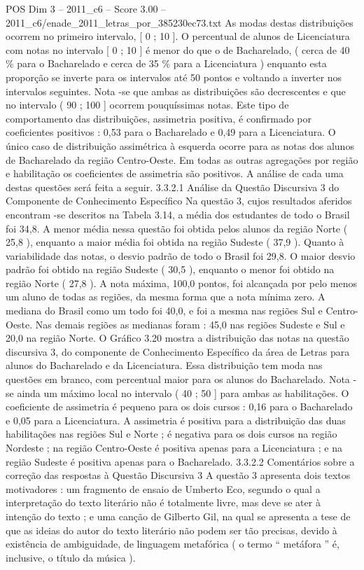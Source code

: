 \begin{textsample}{POS Dim 3 – 2011\_c6 – Score 3.00 – 2011\_c6/enade\_2011\_letras\_por\_385230ec73.txt}
As modas destas distribuições ocorrem no primeiro intervalo, [ 0 ; 10 ].
O percentual de alunos de Licenciatura com notas no intervalo [ 0 ; 10 ] é menor do que o de Bacharelado, ( cerca de 40 \% para o Bacharelado e cerca de 35 \% para a Licenciatura ) enquanto esta proporção se inverte para os intervalos até 50 pontos e voltando a inverter nos intervalos seguintes.
Nota -se que ambas as distribuições são decrescentes e que no intervalo ( 90 ; 100 ] ocorrem pouquíssimas notas.
Este tipo de comportamento das distribuições, assimetria positiva, é confirmado por coeficientes positivos : 0,53 para o Bacharelado e 0,49 para a Licenciatura.
O único caso de distribuição assimétrica à esquerda ocorre para as notas dos alunos de Bacharelado da região Centro-Oeste.
Em todas as outras agregações por região e habilitação os coeficientes de assimetria são positivos.
A análise de cada uma destas questões será feita a seguir. 3.3.2.1 Análise da Questão Discursiva 3 do Componente de Conhecimento Específico Na questão 3, cujos resultados aferidos encontram -se descritos na Tabela 3.14, a média dos estudantes de todo o Brasil foi 34,8.
A menor média nessa questão foi obtida pelos alunos da região Norte ( 25,8 ), enquanto a maior média foi obtida na região Sudeste ( 37,9 ).
Quanto à variabilidade das notas, o desvio padrão de todo o Brasil foi 29,8.
O maior desvio padrão foi obtido na região Sudeste ( 30,5 ), enquanto o menor foi obtido na região Norte ( 27,8 ).
A nota máxima, 100,0 pontos, foi alcançada por pelo menos um aluno de todas as regiões, da mesma forma que a nota mínima zero.
A mediana do Brasil como um todo foi 40,0, e foi a mesma nas regiões Sul e Centro-Oeste.
Nas demais regiões as medianas foram : 45,0 nas regiões Sudeste e Sul e 20,0 na região Norte.
O Gráfico 3.20 mostra a distribuição das notas na questão discursiva 3, do componente de Conhecimento Específico da área de Letras para alunos do Bacharelado e da Licenciatura.
Essa distribuição tem moda nas questões em branco, com percentual maior para os alunos do Bacharelado.
Nota -se ainda um máximo local no intervalo ( 40 ; 50 ] para ambas as habilitações.
O coeficiente de assimetria é pequeno para os dois cursos : 0,16 para o Bacharelado e 0,05 para a Licenciatura.
A assimetria é positiva para a distribuição das duas habilitações nas regiões Sul e Norte ; é negativa para os dois cursos na região Nordeste ; na região Centro-Oeste é positiva apenas para a Licenciatura ; e na região Sudeste é positiva apenas para o Bacharelado. 3.3.2.2 Comentários sobre a correção das respostas à Questão Discursiva 3 A questão 3 apresenta dois textos motivadores : um fragmento de ensaio de Umberto Eco, segundo o qual a interpretação do texto literário não é totalmente livre, mas deve se ater à intenção do texto ; e uma canção de Gilberto Gil, na qual se apresenta a tese de que as ideias do autor do texto literário não podem ser tão precisas, devido à existência de ambiguidade, de linguagem metafórica ( o termo “ metáfora ” é, inclusive, o título da música ).

\end{textsample}
